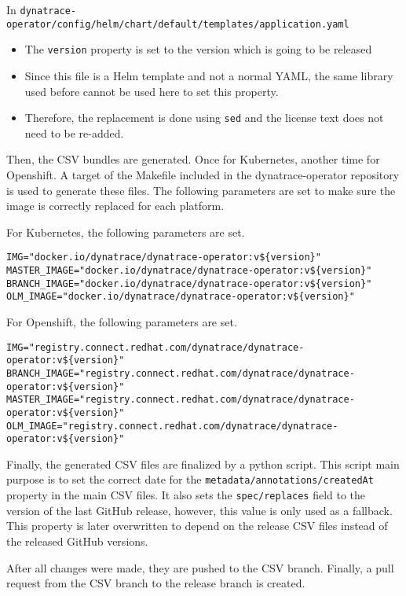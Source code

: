 In \verb|dynatrace-operator/config/helm/chart/default/templates/application.yaml|
\begin{itemize}
    \item The \verb|version| property is set to the version which is going to be released
    \item Since this file is a Helm template and not a normal YAML, the same library used before cannot be used here to set this property.
    \item Therefore, the replacement is done using \verb|sed| and the license text does not need to be re-added.
\end{itemize}

Then, the CSV bundles are generated.
Once for Kubernetes, another time for Openshift.
A target of the Makefile included in the dynatrace-operator repository is used to generate these files.
The following parameters are set to make sure the image is correctly replaced for each platform.

For Kubernetes, the following parameters are set.

\begin{verbatim}
IMG="docker.io/dynatrace/dynatrace-operator:v${version}"
MASTER_IMAGE="docker.io/dynatrace/dynatrace-operator:v${version}"
BRANCH_IMAGE="docker.io/dynatrace/dynatrace-operator:v${version}"
OLM_IMAGE="docker.io/dynatrace/dynatrace-operator:v${version}"
\end{verbatim}

For Openshift, the following parameters are set.

\begin{verbatim}
IMG="registry.connect.redhat.com/dynatrace/dynatrace-operator:v${version}"
BRANCH_IMAGE="registry.connect.redhat.com/dynatrace/dynatrace-operator:v${version}"
MASTER_IMAGE="registry.connect.redhat.com/dynatrace/dynatrace-operator:v${version}"
OLM_IMAGE="registry.connect.redhat.com/dynatrace/dynatrace-operator:v${version}"
\end{verbatim}

Finally, the generated CSV files are finalized by a python script.
This script main purpose is to set the correct date for the \verb|metadata/annotations/createdAt| property in the main CSV files.
It also sets the \verb|spec/replaces| field to the version of the last GitHub release, however, this value is only used as a fallback.
This property is later overwritten to depend on the release CSV files instead of the released GitHub versions.

After all changes were made, they are pushed to the CSV branch.
Finally, a pull request from the CSV branch to the release branch is created.

